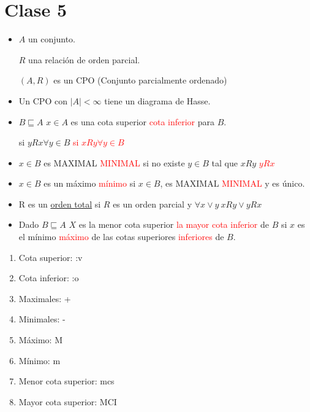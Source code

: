 \documentclass[12pt, twoside]{article}
\begin{document}
\chapter*{Clase 5}%
\thispagestyle{fancy}


\begin{itemize}
	\item $A$ un conjunto.

		$R$ una relación de orden parcial.

		$(A,R)$ es un CPO (Conjunto parcialmente ordenado)

	\item Un CPO con $|A| < \infty$ tiene un diagrama de Hasse.

	\item $B \sqsubseteq A$
		$x\in A$ es una cota superior \textcolor{red}{cota inferior} para $B$.

		si $yRx \forall y\in B$
		\textcolor{red}{si $xRy \forall y\in B$}

	\item $x\in B$ es MAXIMAL \textcolor{red}{MINIMAL} si no existe $y\in B$
		tal que $xRy$ \textcolor{red}{$yRx$}

	\item $x\in B$ es un máximo \textcolor{red}{mínimo} si $x\in B$, es MAXIMAL
		\textcolor{red}{MINIMAL} y es único.

	\item R es un \underline{orden total} si $R$ es un orden parcial y
		$\forall x \vee y\ xRy \vee yRx$

	\item Dado $B \sqsubseteq A$ $X$ es la menor cota superior
		\textcolor{red}{la mayor cota inferior} de $B$ si $x$
		es el mínimo \textcolor{red}{máximo} de las cotas superiores
		\textcolor{red}{inferiores } de $B$.
\end{itemize}
\begin{enumerate}
	\item Cota superior: :v
	\item Cota inferior: :o
	\item Maximales: +
	\item Minimales: -
	\item Máximo: M
	\item Mínimo: m
	\item Menor cota superior: mcs
	\item Mayor cota superior: MCI
\end{enumerate}
\end{document}
